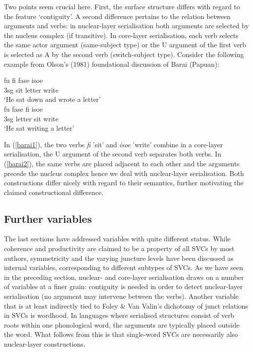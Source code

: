 Two points seem crucial here. First, the surface structure differs with regard to the feature `contiguity'. A second difference pertains to the relation between arguments and verbs: in nuclear-layer serialisation both arguments are selected by the nucleus complex (if transitive). In core-layer serialisation, each verb selects the same actor argument (same-subject type) or the U argument of the first verb is selected as A by the second verb (switch-subject type). Consider the following example from Olson's (1981) foundational discussion of Barai (Papuan):

\pex 
\a \label{barai1}
\gll fu fi fase isoe \\
\acs{3}\acs{sg} sit letter write \\
\glft `He sat down and wrote a letter' \\ 
\z
\a \label{barai2}
\gla fu fase fi isoe \\ 
\acs{3}\acs{sg} letter sit write \\
\glft `He sat writing a letter' \\ 
\z
\xe

In (\ref{barai1}), the two verbs \textit{fi} 'sit' and \textit{isoe} 'write' combine in a core-layer serialisation, the U argument of the second verb separates both verbs. In (\ref{barai2}), the same verbs are placed adjacent to each other and the arguments precede the nucleus complex hence we deal with nuclear-layer serialisation. Both constructions differ nicely with regard to their semantics, further motivating the claimed constructional difference.

\subsection{Further variables}

The last sections have addressed variables with quite different status. While coherence and productivity are claimed to be a property of all SVCs by most authors, symmetricity and the varying juncture levels have been discussed as internal variables, corresponding to different subtypes of SVCs. As we have seen in the preceding section, nuclear- and core-layer serialisation draws on a number of variables at a finer grain: contiguity is needed in order to detect nuclear-layer serialisation (no argument may intervene between the verbs). Another variable that is at least indirectly tied to Foley \& Van Valin's dichotomy of junct relations in SVCs is wordhood. In languages where serialised structures consist of verb roots within one phonological word, the arguments are typically placed outside the word. What follows from this is that single-word SVCs are necessarily also nuclear-layer constructions. 


